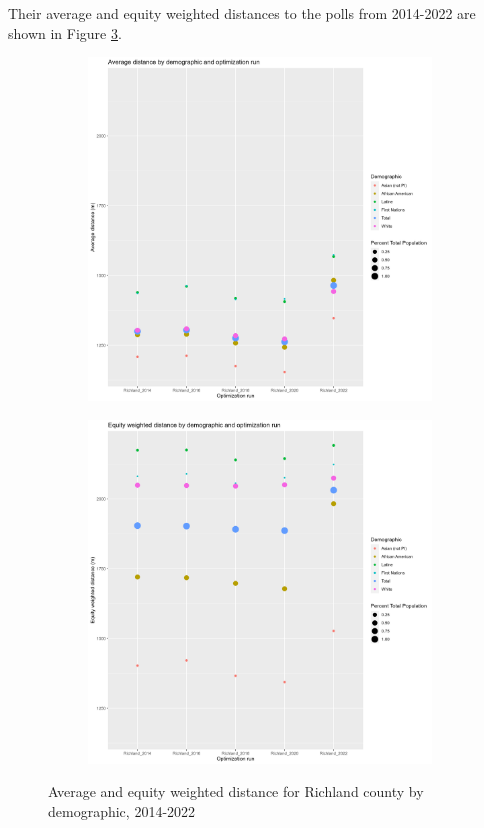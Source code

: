 \documentclass[11pt]{article}
\theoremstyle{remark}
\theoremstyle{definition}
\begin{document}
Their average and equity weighted distances to the polls from 2014-2022 are shown in Figure \ref{fig:Richland distance graphs}.

\begin{figure}
	\begin{subfigure}{.8\textwidth}
		\centering
		\includegraphics[width=.8\linewidth]{result_analysis/Richland_County_SC_original_configs/orig_pop_scaled_avg}
		\label{sfig:Richland avg dist}
	\end{subfigure} \newline
	\begin{subfigure}{.8\textwidth}
		\centering
		\includegraphics[width=.8\linewidth]{result_analysis/Richland_County_SC_original_configs/orig_pop_scaled_y_EDE}
		\label{sfig:Richland equity dist}
	\end{subfigure}
	\caption{Average and equity weighted distance for Richland county by demographic, 2014-2022}
	\label{fig:Richland distance graphs}
\end{figure}
\end{document}

